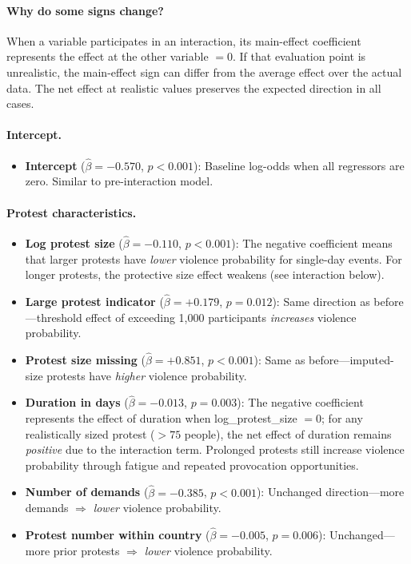 \documentclass[12pt,a4paper]{article}
\begin{document}
\paragraph{Why do some signs change?}
When a variable participates in an interaction, its main-effect coefficient represents the effect at the other variable $= 0$. If that evaluation point is unrealistic, the main-effect sign can differ from the average effect over the actual data. The net effect at realistic values preserves the expected direction in all cases.

\paragraph{Intercept.}
\begin{itemize}
  \item \textbf{Intercept} ($\hat{\beta} = -0.570$, $p < 0.001$): Baseline log-odds when all regressors are zero. Similar to pre-interaction model.
\end{itemize}

\paragraph{Protest characteristics.}
\begin{itemize}
  \item \textbf{Log protest size} ($\hat{\beta} = -0.110$, $p < 0.001$): The negative coefficient means that larger protests have \emph{lower} violence probability for single-day events. For longer protests, the protective size effect weakens (see interaction below).
  \item \textbf{Large protest indicator} ($\hat{\beta} = +0.179$, $p = 0.012$): Same direction as before---threshold effect of exceeding 1,000 participants \emph{increases} violence probability.
  \item \textbf{Protest size missing} ($\hat{\beta} = +0.851$, $p < 0.001$): Same as before---imputed-size protests have \emph{higher} violence probability.
  \item \textbf{Duration in days} ($\hat{\beta} = -0.013$, $p = 0.003$): The negative coefficient represents the effect of duration when log\_protest\_size $= 0$; for any realistically sized protest ($>75$ people), the net effect of duration remains \emph{positive} due to the interaction term. Prolonged protests still increase violence probability through fatigue and repeated provocation opportunities.
  \item \textbf{Number of demands} ($\hat{\beta} = -0.385$, $p < 0.001$): Unchanged direction---more demands $\Rightarrow$ \emph{lower} violence probability.
  \item \textbf{Protest number within country} ($\hat{\beta} = -0.005$, $p = 0.006$): Unchanged---more prior protests $\Rightarrow$ \emph{lower} violence probability.
\end{itemize}
\end{document}
